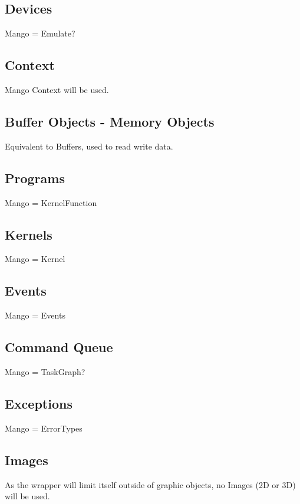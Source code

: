 \documentclass[a4paper]{article}
\begin{document}
\subsection{Devices}
Mango = Emulate?
\subsection{Context}
Mango Context will be used.
\subsection{Buffer Objects - Memory Objects}
Equivalent to Buffers, used to read write data.
\subsection{Programs}
Mango = KernelFunction
\subsection{Kernels}
Mango = Kernel
\subsection{Events}
Mango = Events
\subsection{Command Queue}
Mango = TaskGraph?
\subsection{Exceptions}
Mango = ErrorTypes
\subsection{Images}
As the wrapper will limit itself outside of graphic objects, no Images (2D or 3D) will be used.
\end{document}
